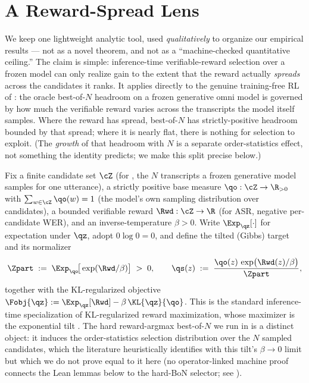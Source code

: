 \section{A Reward-Spread Lens}
\label{sec:osa}

We keep one lightweight analytic tool, used \emph{qualitatively} to organize our empirical results
--- not as a novel theorem, and not as a ``machine-checked quantitative ceiling.'' The claim is
simple: inference-time verifiable-reward selection over a frozen model can only realize gain to the
extent that the reward actually \emph{spreads} across the candidates it ranks. It applies directly to
the genuine training-free RL of : the oracle best-of-$N$ headroom on a frozen generative
omni model is governed by how much the verifiable reward varies across the transcripts the model
itself samples. Where the reward has spread, best-of-$N$ has strictly-positive headroom bounded by that spread; where it
is nearly flat, there is nothing for selection to exploit. (The \emph{growth} of that headroom with $N$
is a separate order-statistics effect, not something the identity predicts; we make this split precise
below.)

Fix a finite candidate set $\cZ$ (for , the $N$ transcripts a frozen generative model
samples for one utterance), a strictly positive base measure $\qo:\cZ\to\R_{>0}$ with
$\sum_{w\in\cZ}\qo(w)=1$ (the model's own sampling distribution over candidates), a bounded verifiable
reward $\Rwd:\cZ\to\R$ (for ASR, negative per-candidate WER), and an inverse-temperature $\beta>0$.
Write $\Exp_{\qz}[\cdot]$ for expectation under $\qz$, adopt $0\log0=0$, and define the tilted (Gibbs)
target and its normalizer
\[
\Zpart \;:=\; \Exp_{\qo}\!\big[\exp(\Rwd/\beta)\big] \;>\;0,
\qquad
\qs(z) \;:=\; \frac{\qo(z)\,\exp\!\big(\Rwd(z)/\beta\big)}{\Zpart},
\]
together with the KL-regularized objective
$\Fobj{\qz} := \Exp_{\qz}[\Rwd] - \beta\,\KL{\qz}{\qo}$. This is the standard inference-time
specialization of KL-regularized reward maximization, whose maximizer is the exponential tilt
\citep{korbak2022kl,mudgal2024controlled}. The hard reward-argmax best-of-$N$ we run in 
is a distinct object: it induces the order-statistics selection distribution over the $N$ sampled
candidates, which the literature heuristically identifies with this tilt's $\beta\to0$ limit
\citep{beirami2024bon} but which we do not prove equal to it here (no operator-linked machine proof
connects the Lean lemmas below to the hard-BoN selector; see ).

